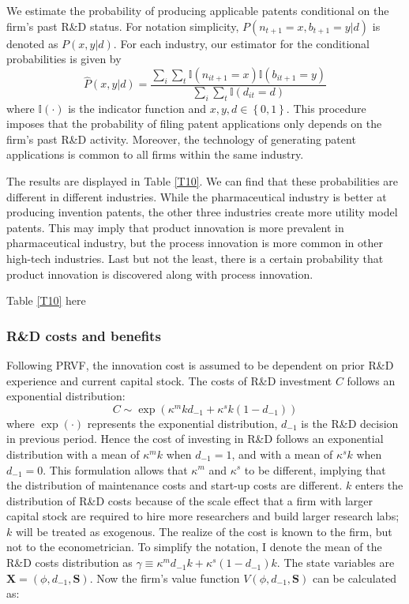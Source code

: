 \documentclass[English]{article}
\begin{document}
We estimate the probability of producing applicable patents conditional
on the firm's past R\&D status. For notation simplicity, $P\left(n_{t+1}=x,b_{t+1}=y|d\right)$
is denoted as $P\left(x,y|d\right)$. For each industry, our estimator
for the conditional probabilities is given by 
\begin{equation}
\hat{P}\left(x,y|d\right)=\frac{\sum_{i}\sum_{t}\mathbb{I}\left(n_{it+1}=x\right)\mathbb{I}\left(b_{it+1}=y\right)}{\sum_{i}\sum_{t}\mathbb{I}\left(d_{it}=d\right)}
\end{equation}
where $\mathbb{I}\left(\cdot\right)$ is the indicator function and
$x,y,d\in\left\{ 0,1\right\} $. This procedure imposes that the
probability of filing patent applications only depends on the firm's
past R\&D activity. Moreover, the technology of generating patent applications is common to all firms within the same industry. 

The results are displayed in Table \ref{T10}.
We can find that these probabilities are different in
different industries. While the pharmaceutical industry is better at producing invention patents, the other three industries create more utility model patents. This may imply that product innovation is more prevalent in pharmaceutical industry, but the process innovation is more common in other high-tech industries. Last but not the least, there is a certain probability that product innovation is discovered along with process innovation. 
\begin{center}
Table \ref{T10} here
\par\end{center}

\subsubsection{R\&D costs and benefits}
Following PRVF, the innovation cost is assumed to be dependent on prior
R\&D experience and current capital stock. The costs of R\&D investment $C$ follows an exponential distribution:
\begin{equation}
C\sim \exp \left(\kappa^m kd_{-1}+\kappa ^s k(1-d_{-1})  \right)\label{d cost}
\end{equation}
where $\exp(\cdot)$ represents the exponential distribution, $d_{-1}$ is the R\&D decision in previous period. Hence the cost of investing in R\&D follows an exponential distribution with a mean of $\kappa ^m k$ when $d_{-1}=1$, and with a mean of $\kappa ^sk$ when $d_{-1}=0$. This formulation allows that $\kappa ^m$ and $\kappa ^s$ to be different, implying that the distribution of maintenance costs and start-up costs are different. $k$ enters the distribution of R\&D costs because of the scale effect that a firm with larger capital stock are required to hire more researchers and build larger research labs; $k$ will be treated as exogenous. The realize of the cost is known to the firm, but not to the econometrician. To simplify the notation, I denote the mean of the R\&D costs distribution as $\gamma \equiv \kappa ^m d_{-1} k+\kappa ^s  (1-d_{-1})k$.
The state variables are $\mathbf{X}=(\phi, d_{-1},\mathbf{S})$. Now the firm's value function $V(\phi, d_{-1}, \mathbf{S})$ can be calculated as:
\end{document}
